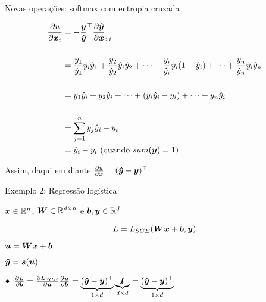 \documentclass[10pt]{beamer}
\begin{document}
\begin{frame}{Novas operações: softmax com entropia cruzada}

\begin{align*}
\frac{\partial u}{\partial \bm{x}_{i}} &= -\frac{\bm{y}}{\bm{\hat{y}}}^{\top} \frac{\partial \bm{\hat{y}}}{\partial \bm{x}}_{:, i}\\
&\\
&= \frac{y_{1}}{\hat{y}_{1}}\hat{y}_{i}\hat{y}_{1} + \frac{y_{2}}{\hat{y}_{2}}\hat{y}_{i}\hat{y}_{2} + \dots - \frac{y_{i}}{\hat{y}_{i}}\hat{y}_{i}(1 - \hat{y}_{i}) + \dots +  \frac{y_{n}}{\hat{y}_{n}}\hat{y}_{i}\hat{y}_{n} \\
&\\
&= y_{1}\hat{y}_{i} + y_{2}\hat{y}_{i} + \dots + (y_{i}\hat{y}_{i} - y_{i}) + \dots +  y_{n}\hat{y}_{i} \\
&\\
&=  \sum_{j=1}^{n} y_{j}\hat{y}_{i} - y_{i}\\
&=  \hat{y}_{i} - y_{i} \text{ (quando } sum(\bm{y})=1 \text{)}
\end{align*}

Assim, daqui em diante $\frac{\partial u}{\partial \bm{x}} = (\bm{\hat{y}} - \bm{y})^{\top}$
\end{frame}

\begin{frame}{Exemplo 2: Regressão logística}
\large{

$\bm{x}\in \mathbb{R}^{n}$, $\bm{W} \in \mathbb{R}^{d\times n}$ e $\bm{b}, \bm{y} \in \mathbb{R}^{d}$

\vspace{0.1 cm}

\begin{equation*}
L = L_{SCE}(\bm{W}\bm{x} + \bm{b}, \bm{y})
\end{equation*}

\vspace{0.1 cm}
$\bm{u} = \bm{W}\bm{x} + \bm{b}$

\vspace{0.1 cm}
$\bm{\hat{y}} = \bm{s}(\bm{u})$

\vspace{0.5 cm}

 $\bullet \; \; \frac{\partial L}{\partial \bm{b}} = \frac{\partial L_{SCE}}{\partial \bm{u}}\frac{\partial \bm{u}}{\partial \bm{b}} = \underbrace{(\bm{\hat{y}} - \bm{y})^{\top}}_{\tiny{1 \times d}} \underbrace{\bm{I}}_{\tiny{d \times d}} = \underbrace{(\bm{\hat{y}} - \bm{y})^{\top}}_{\tiny{1 \times d}}$
}
\end{frame}
\end{document}
